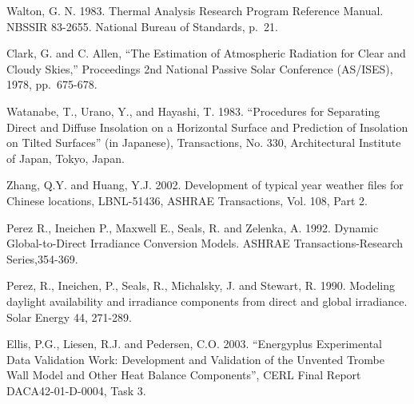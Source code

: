 Walton, G. N. 1983. Thermal Analysis Research Program Reference Manual. NBSSIR 83-2655. National Bureau of Standards, p.~21.

Clark, G. and C. Allen, ``The Estimation of Atmospheric Radiation for Clear and Cloudy Skies,'' Proceedings 2nd National Passive Solar Conference (AS/ISES), 1978, pp.~675-678.

Watanabe, T., Urano, Y., and Hayashi, T. 1983. ``Procedures for Separating Direct and Diffuse Insolation on a Horizontal Surface and Prediction of Insolation on Tilted Surfaces'' (in Japanese), Transactions, No. 330, Architectural Institute of Japan, Tokyo, Japan.

Zhang, Q.Y. and Huang, Y.J. 2002. Development of typical year weather files for Chinese locations, LBNL-51436, ASHRAE Transactions, Vol. 108, Part 2.

Perez R., Ineichen P., Maxwell E., Seals, R. and Zelenka, A. 1992. Dynamic Global-to-Direct Irradiance Conversion Models. ASHRAE Transactions-Research Series,354-369.

Perez, R., Ineichen, P., Seals, R., Michalsky, J. and Stewart, R. 1990. Modeling daylight availability and irradiance components from direct and global irradiance. Solar Energy 44, 271-289.

Ellis, P.G., Liesen, R.J. and Pedersen, C.O. 2003. ``Energyplus Experimental Data Validation Work: Development and Validation of the Unvented Trombe Wall Model and Other Heat Balance Components'', CERL Final Report DACA42-01-D-0004, Task 3.
